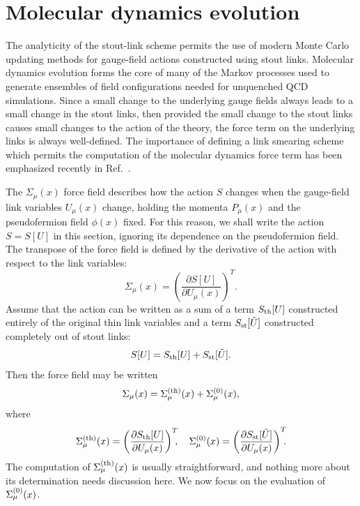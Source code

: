 \section{Molecular dynamics evolution}
\label{sec:force}

The analyticity of the stout-link scheme permits the use of modern Monte
Carlo updating methods for gauge-field actions constructed using stout links.
Molecular dynamics evolution forms the core of many of the Markov processes
used to generate ensembles of field configurations needed for unquenched
QCD simulations\cite{hmcgauge,hmcfermion,hmc,Ralgorithm}.
Since a small change to the underlying gauge
fields always leads to a small change in the stout links, then provided
the small change to the stout links causes small changes to the action of
the theory, the force term on the underlying links is always well-defined. 
The importance of defining a link smearing scheme which permits the
computation of the molecular dynamics force term has been emphasized
recently in Ref.~\cite{flic2}.

The $\Sigma_\mu(x)$ force field describes how the action $S$ changes
when the gauge-field link variables $U_\mu(x)$ change, holding the momenta 
$P_\mu(x)$ and the pseudofermion field $\phi(x)$ fixed.
For this reason, we shall write the action $S=S[U]$ in this section,
ignoring its dependence on the pseudofermion field.  The transpose
of the force field is defined by the derivative of the action with
respect to the link variables:
\begin{equation}
 \Sigma_\mu(x)=\left(\frac{\partial S[U]}{\partial U_\mu(x)}\right)^T.
\end{equation}
Assume that the action can be written as a sum of
a term $S_{\rm th}[U]$ constructed entirely of the original thin
link variables and a term $S_{\rm st}[\tilde{U}]$ constructed
completely out of stout links:
\begin{equation}
  S[U]=S_{\rm th}[U]+S_{\rm st}[\tilde{U}].
\end{equation}
Then the force field may be written
\begin{equation}
  \Sigma_\mu(x)=\Sigma_\mu^{\rm(th)}(x)+\Sigma_\mu^{(0)}(x),
\end{equation}
where
\begin{equation}
 \Sigma_\mu^{\rm(th)}(x)=\left(\frac{\partial S_{\rm th}[U]}{
  \partial U_\mu(x)}\right)^T\!\!\!, \quad
 \Sigma_\mu^{\rm(0)}(x)=\left(\frac{\partial S_{\rm st}[\tilde{U}]}{
  \partial U_\mu(x)}\right)^T\!\!\!.
\end{equation}
The computation of $\Sigma_\mu^{\rm(th)}(x)$ is usually
straightforward, and nothing more about its determination needs
discussion here.  We now focus on the evaluation of 
$\Sigma_\mu^{\rm(0)}(x)$. 

